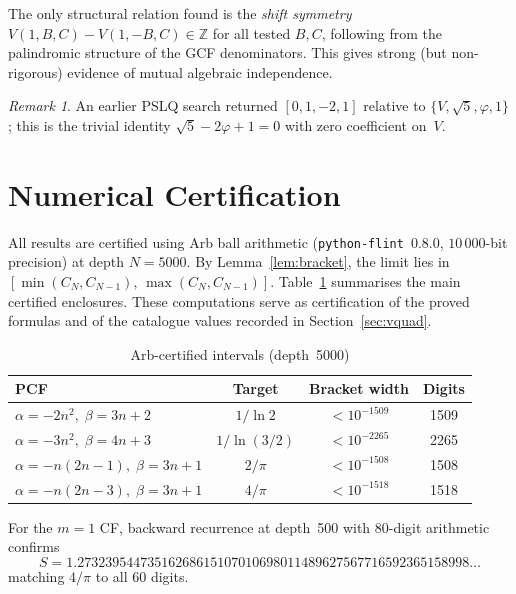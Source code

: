 \documentclass[11pt,a4paper]{article}
\theoremstyle{plain}
\theoremstyle{definition}
\theoremstyle{remark}
\newtheorem{remark}[theorem]{Remark}
\begin{document}
The only structural relation found is the \emph{shift symmetry}
$V(1,B,C) - V(1,-B,C) \in \mathbb{Z}$ for all tested $B, C$,
following from the palindromic structure of the GCF denominators.
This gives strong (but non-rigorous) evidence of mutual algebraic
independence.

\begin{remark}
An earlier PSLQ search returned $[0, 1, -2, 1]$ relative to
$\{V, \sqrt{5}, \varphi, 1\}$; this is the trivial identity
$\sqrt{5} - 2\varphi + 1 = 0$ with zero coefficient on~$V$.
\end{remark}

\appendix
\section{Numerical Certification}\label{sec:cert}

All results are certified using Arb ball arithmetic
(\texttt{python-flint}~0.8.0, $10\,000$-bit precision)
at depth $N = 5000$.
By Lemma~\ref{lem:bracket}, the limit lies in
$[\min(C_N, C_{N-1}),\, \max(C_N, C_{N-1})]$.
Table~\ref{tab:cert} summarises the main certified enclosures.
These computations serve as certification of the proved formulas and of the
catalogue values recorded in Section~\ref{sec:vquad}.

\begin{table}[ht]
\centering
\caption{Arb-certified intervals (depth~5000)}\label{tab:cert}
\begin{tabular}{@{}lccc@{}}
\toprule
PCF & Target & Bracket width & Digits \\
\midrule
$\alpha{=}{-}2n^2,\;\beta{=}3n{+}2$
  & $1/\ln 2$    & $<10^{-1509}$ & 1509 \\
$\alpha{=}{-}3n^2,\;\beta{=}4n{+}3$
  & $1/\ln(3/2)$ & $<10^{-2265}$ & 2265 \\
$\alpha{=}{-}n(2n{-}1),\;\beta{=}3n{+}1$
  & $2/\pi$      & $<10^{-1508}$ & 1508 \\
$\alpha{=}{-}n(2n{-}3),\;\beta{=}3n{+}1$
  & $4/\pi$      & $<10^{-1518}$ & 1518 \\
\bottomrule
\end{tabular}
\end{table}

For the $m = 1$ CF, backward recurrence at depth~500 with
80-digit arithmetic confirms
\[
  S = 1.27323954473516268615107010698011489627567716592365158998\ldots
\]
matching $4/\pi$ to all 60 digits.
\end{document}
